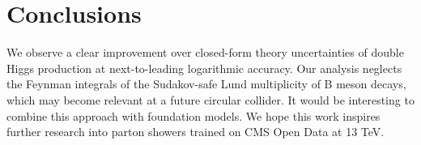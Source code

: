 \section{Conclusions}\label{sec:conclusions}

We observe a clear improvement over closed-form theory uncertainties of
double Higgs production at next-to-leading logarithmic accuracy. Our
analysis neglects the Feynman integrals of the Sudakov-safe Lund
multiplicity of B meson decays, which may become relevant at a future
circular collider. It would be interesting to combine this approach with
foundation models. We hope this work inspires further research into
parton showers trained on CMS Open Data at 13 TeV.

